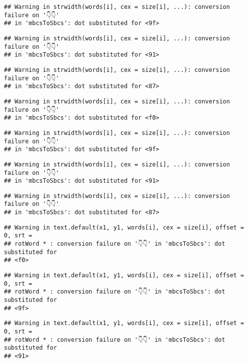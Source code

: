 \documentclass[
]{article}
\begin{document}
\begin{verbatim}
## Warning in strwidth(words[i], cex = size[i], ...): conversion failure on '👇👇'
## in 'mbcsToSbcs': dot substituted for <9f>
\end{verbatim}

\begin{verbatim}
## Warning in strwidth(words[i], cex = size[i], ...): conversion failure on '👇👇'
## in 'mbcsToSbcs': dot substituted for <91>
\end{verbatim}

\begin{verbatim}
## Warning in strwidth(words[i], cex = size[i], ...): conversion failure on '👇👇'
## in 'mbcsToSbcs': dot substituted for <87>
\end{verbatim}

\begin{verbatim}
## Warning in strwidth(words[i], cex = size[i], ...): conversion failure on '👇👇'
## in 'mbcsToSbcs': dot substituted for <f0>
\end{verbatim}

\begin{verbatim}
## Warning in strwidth(words[i], cex = size[i], ...): conversion failure on '👇👇'
## in 'mbcsToSbcs': dot substituted for <9f>
\end{verbatim}

\begin{verbatim}
## Warning in strwidth(words[i], cex = size[i], ...): conversion failure on '👇👇'
## in 'mbcsToSbcs': dot substituted for <91>
\end{verbatim}

\begin{verbatim}
## Warning in strwidth(words[i], cex = size[i], ...): conversion failure on '👇👇'
## in 'mbcsToSbcs': dot substituted for <87>
\end{verbatim}

\begin{verbatim}
## Warning in text.default(x1, y1, words[i], cex = size[i], offset = 0, srt =
## rotWord * : conversion failure on '👇👇' in 'mbcsToSbcs': dot substituted for
## <f0>
\end{verbatim}

\begin{verbatim}
## Warning in text.default(x1, y1, words[i], cex = size[i], offset = 0, srt =
## rotWord * : conversion failure on '👇👇' in 'mbcsToSbcs': dot substituted for
## <9f>
\end{verbatim}

\begin{verbatim}
## Warning in text.default(x1, y1, words[i], cex = size[i], offset = 0, srt =
## rotWord * : conversion failure on '👇👇' in 'mbcsToSbcs': dot substituted for
## <91>
\end{verbatim}
\end{document}
